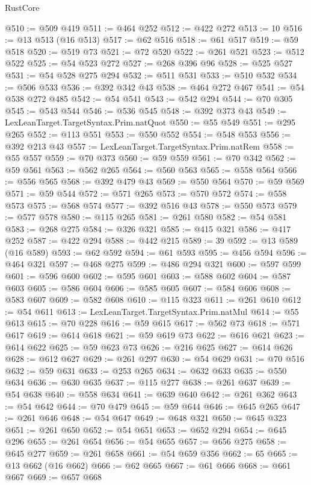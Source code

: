 \begin{lexlean}{RustCore}
\begin{coremodule}
@510 := @509 @419
@511 := @464 @252
@512 := @422 @272
@513 := 10
@516 := @13 @513 (@16 @513)
@517 := @62 @516
@518 := @61 @517
@519 := @59 @518
@520 := @519 @73
@521 := @72 @520
@522 := @261 @521
@523 := @512 @522
@525 := @54 @523 @272
@527 := @268 @396 @96
@528 := @525 @527
@531 := @54 @528 @275 @294
@532 := @511 @531
@533 := @510 @532
@534 := @506 @533
@536 := @392 @342 @43
@538 := @464 @272 @467
@541 := @54 @538 @272 @485
@542 := @54 @541
@543 := @542 @294
@544 := @70 @305
@545 := @543 @544
@546 := @536 @545
@548 := @392 @373 @43
@549 := LexLeanTarget.TargetSyntax.Prim.natQuot
@550 := @55 @549
@551 := @295 @265
@552 := @113 @551
@553 := @550 @552
@554 := @548 @553
@556 := @392 @213 @43
@557 := LexLeanTarget.TargetSyntax.Prim.natRem
@558 := @55 @557
@559 := @70 @373
@560 := @59 @559
@561 := @70 @342
@562 := @59 @561
@563 := @562 @265
@564 := @560 @563
@565 := @558 @564
@566 := @556 @565
@568 := @392 @479 @43
@569 := @550 @564
@570 := @59 @569
@571 := @59 @544
@572 := @571 @265
@573 := @570 @572
@574 := @558 @573
@575 := @568 @574
@577 := @392 @516 @43
@578 := @550 @573
@579 := @577 @578
@580 := @115 @265
@581 := @261 @580
@582 := @54 @581
@583 := @268 @275
@584 := @326 @321
@585 := @415 @321
@586 := @417 @252
@587 := @422 @294
@588 := @442 @215
@589 := 39
@592 := @13 @589 (@16 @589)
@593 := @62 @592
@594 := @61 @593
@595 := @456 @594
@596 := @464 @321
@597 := @468 @275
@599 := @486 @294 @321
@600 := @597 @599
@601 := @596 @600
@602 := @595 @601
@603 := @588 @602
@604 := @587 @603
@605 := @586 @604
@606 := @585 @605
@607 := @584 @606
@608 := @583 @607
@609 := @582 @608
@610 := @115 @323
@611 := @261 @610
@612 := @54 @611
@613 := LexLeanTarget.TargetSyntax.Prim.natMul
@614 := @55 @613
@615 := @70 @228
@616 := @59 @615
@617 := @562 @73
@618 := @571 @617
@619 := @614 @618
@621 := @59 @619 @73
@622 := @616 @621
@623 := @614 @622
@625 := @59 @623 @73
@626 := @216 @625
@627 := @614 @626
@628 := @612 @627
@629 := @261 @297
@630 := @54 @629
@631 := @70 @516
@632 := @59 @631
@633 := @253 @265
@634 := @632 @633
@635 := @550 @634
@636 := @630 @635
@637 := @115 @277
@638 := @261 @637
@639 := @54 @638
@640 := @558 @634
@641 := @639 @640
@642 := @261 @362
@643 := @54 @642
@644 := @70 @479
@645 := @59 @644
@646 := @645 @265
@647 := @261 @646
@648 := @54 @647
@649 := @648 @321
@650 := @645 @323
@651 := @261 @650
@652 := @54 @651
@653 := @652 @294
@654 := @645 @296
@655 := @261 @654
@656 := @54 @655
@657 := @656 @275
@658 := @645 @277
@659 := @261 @658
@661 := @54 @659 @356
@662 := 65
@665 := @13 @662 (@16 @662)
@666 := @62 @665
@667 := @61 @666
@668 := @661 @667
@669 := @657 @668

\end{coremodule}
\end{lexlean}
